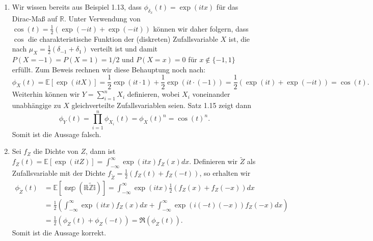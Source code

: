 \documentclass[a4paper]{article}
\begin{document}
\begin{enumerate}
	\item Wir wissen bereits aus Beispiel 1.13, dass $\phi_{\delta_x}(t) = \exp(i t x)$ für das Dirac-Maß auf $\mathds{R}$. Unter Verwendung von $\cos(t) = \frac{1}{2} (\exp(-it) + \exp(-it))$ können wir daher folgern, dass $\cos$ die charakteristische Funktion der (diskreten) Zufallsvariable $X$ ist, die nach $\mu_X = \frac{1}{2}(\delta_{-1} + \delta_{1})$ verteilt ist und damit $P(X = -1) = P(X=1) = 1/2$ und $P(X = x) = 0$ für $x \notin \{-1,1\}$ erfüllt. Zum Beweis rechnen wir diese Behauptung noch nach:
	      \begin{equation*}
		      \phi_X(t) = \mathds{E}[\exp(itX)] = \frac{1}{2} \exp(it\cdot 1) + \frac{1}{2} \exp(it \cdot (-1)) = \frac{1}{2} (\exp(it) + \exp(-it))  = \cos(t)\text{.}
	      \end{equation*}
	      Weiterhin können wir $Y = \sum_{i = 1}^{n} X_i$ definieren, wobei $X_i$ voneinander unabhängige zu $X$ gleichverteilte Zufallsvariablen seien. Satz 1.15 zeigt dann
	      \begin{equation*}
		      \phi_Y(t) = \prod_{i=1}^{n} \phi_{X_i}(t) = \phi_X(t)^n = \cos(t)^n\text{.}
	      \end{equation*}
	      Somit ist die Aussage falsch.
	\item Sei $f_Z$ die Dichte von $Z$, dann ist $f_Z(t) = \mathds{E}[\exp(itZ)] = \int_{-\infty}^{\infty} \exp(itx) f_Z(x) dx$. Definieren wir $\tilde Z$ als Zufallsvariable mit der Dichte $f_{\tilde Z} = \frac{1}{2} (f_Z(t) + f_Z(-t))$, so erhalten wir
	      \begin{align*}
		      \phi_{\tilde Z}(t) & = \mathds{E[\exp(it\tilde Zi)]} = \int_{-\infty}^{\infty} \exp(itx) \frac{1}{2} (f_Z(x) + f_Z(-x)) dx                           \\
		                         & = \frac{1}{2} \left( \int_{-\infty}^{\infty} \exp(itx)  f_Z(x) dx + \int_{-\infty}^{\infty} \exp(i(-t)(-x))  f_Z(-x) dx \right) \\
		                         & = \frac{1}{2} \left( \phi_Z(t) + \phi_Z(-t) \right) = \Re(\phi_Z(t))\text{.}
	      \end{align*}
	      Somit ist die Aussage korrekt.
\end{enumerate}
\end{document}
